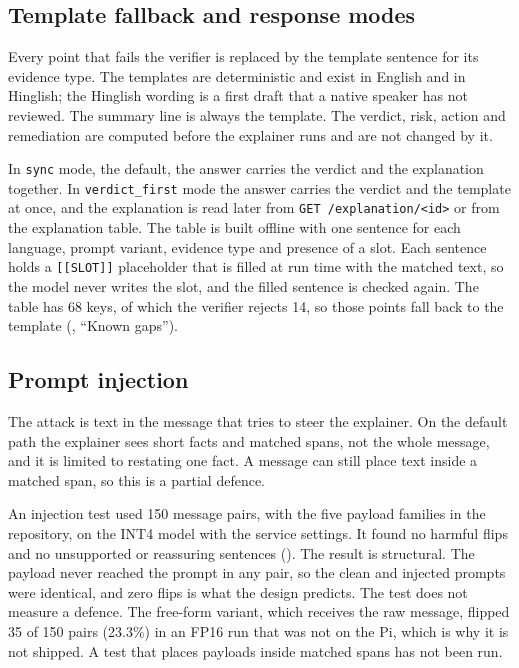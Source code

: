 \subsection{Template fallback and response modes}
\label{sec:fallback}

Every point that fails the verifier is replaced by the template sentence for its evidence type. The templates are deterministic and exist in English and in Hinglish; the Hinglish wording is a first draft that a native speaker has not reviewed. The summary line is always the template. The verdict, risk, action and remediation are computed before the explainer runs and are not changed by it.

In \texttt{sync} mode, the default, the answer carries the verdict and the explanation together. In \texttt{verdict\_first} mode the answer carries the verdict and the template at once, and the explanation is read later from \texttt{GET /explanation/<id>} or from the explanation table. The table is built offline with one sentence for each language, prompt variant, evidence type and presence of a slot. Each sentence holds a \texttt{[[SLOT]]} placeholder that is filled at run time with the matched text, so the model never writes the slot, and the filled sentence is checked again. The table has 68 keys, of which the verifier rejects 14, so those points fall back to the template (, ``Known gaps'')\prose.

\subsection{Prompt injection}
\label{sec:injection}

The attack is text in the message that tries to steer the explainer. On the default path the explainer sees short facts and matched spans, not the whole message, and it is limited to restating one fact. A message can still place text inside a matched span, so this is a partial defence.

An injection test used 150 message pairs, with the five payload families in the repository, on the INT4 model with the service settings. It found no harmful flips and no unsupported or reassuring sentences ()\prose. The result is structural. The payload never reached the prompt in any pair, so the clean and injected prompts were identical, and zero flips is what the design predicts. The test does not measure a defence. The free-form variant, which receives the raw message, flipped 35 of 150 pairs (23.3\%) in an FP16 run that was not on the Pi, which is why it is not shipped. A test that places payloads inside matched spans has not been run.

